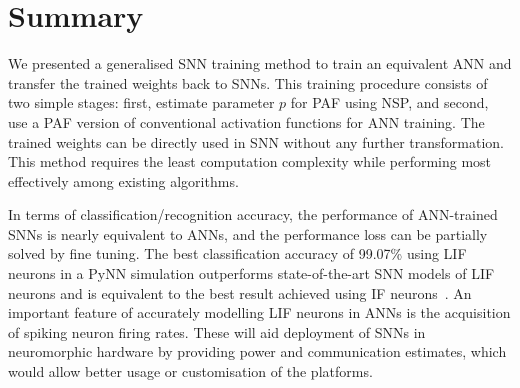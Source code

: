\section{Summary}
	We presented a generalised SNN training method to train an equivalent ANN and transfer the trained weights back to SNNs.
	This training procedure consists of two simple stages: first, estimate parameter $p$ for PAF using NSP, and second, use a PAF version of conventional activation functions for ANN training. %
	The trained weights can be directly used in SNN without any further transformation.
	This method requires the least computation complexity while performing most effectively among existing algorithms.
	
	In terms of classification/recognition accuracy, the performance of ANN-trained SNNs is nearly equivalent to ANNs, and the performance loss can be partially solved by fine tuning.
	The best classification accuracy of 99.07\% using LIF neurons in a PyNN simulation outperforms state-of-the-art SNN models of LIF neurons and is equivalent to the best result achieved using IF neurons~\citep{diehl2015fast}.
	An important feature of accurately modelling LIF neurons in ANNs is the acquisition of spiking neuron firing rates. These will aid deployment of SNNs in neuromorphic hardware by providing power and communication estimates, which would allow better usage or customisation of the platforms.
